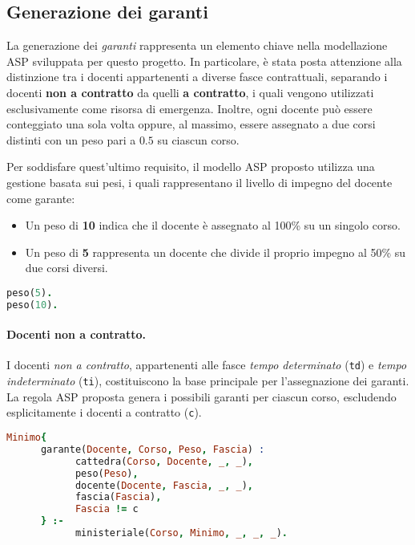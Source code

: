 \subsection{Generazione dei garanti}\label{sec:garanti}

La generazione dei \textit{garanti} rappresenta un elemento chiave nella modellazione ASP 
sviluppata per questo progetto. In particolare, è stata posta attenzione alla distinzione 
tra i docenti appartenenti a diverse fasce contrattuali, separando i docenti 
\textbf{non a contratto} da quelli \textbf{a contratto}, i quali vengono utilizzati 
esclusivamente come risorsa di emergenza.
Inoltre, ogni docente può essere conteggiato una sola volta oppure, al massimo, essere 
assegnato a due corsi distinti con un peso pari a $0.5$ su ciascun corso. 

Per soddisfare quest'ultimo requisito, il modello ASP proposto utilizza una gestione 
basata sui pesi, i quali rappresentano il livello di impegno del docente come garante:
\begin{itemize}
    \item Un peso di \textbf{10} indica che il docente è assegnato al 100\% su un singolo corso.
    \item Un peso di \textbf{5} rappresenta un docente che divide il proprio impegno al 50\% su due corsi diversi.
\end{itemize}

\begin{lstlisting}[language=prolog, caption=Generazione dei pesi.]
% Predicati di base per definire i pesi possibili.
peso(5).
peso(10).
\end{lstlisting}

\paragraph{Docenti non a contratto.}
I docenti \textit{non a contratto}, appartenenti alle fasce \textit{tempo determinato} 
(\texttt{td}) e \textit{tempo indeterminato} (\texttt{ti}), costituiscono la base principale 
per l'assegnazione dei garanti. La regola ASP proposta genera i possibili garanti per ciascun corso, 
escludendo esplicitamente i docenti a contratto (\texttt{c}).

\begin{lstlisting}[language=prolog, caption=Generazione dei garanti non a contratto.]
Minimo{
      garante(Docente, Corso, Peso, Fascia) :
            cattedra(Corso, Docente, _, _),
            peso(Peso),
            docente(Docente, Fascia, _, _),
            fascia(Fascia),
            Fascia != c
      } :-
            ministeriale(Corso, Minimo, _, _, _).
\end{lstlisting}

